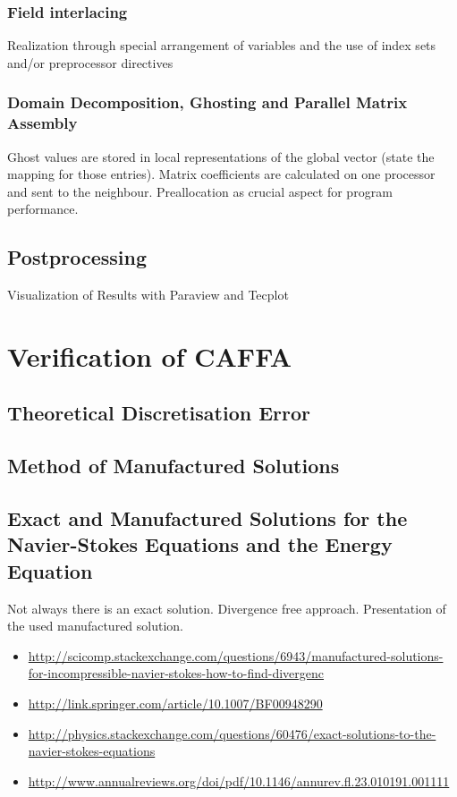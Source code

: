 \documentclass[article,type=msc,colorback,accentcolor=tud2a]{tudthesis}
\begin{document}
      \subsubsection{Field interlacing}
        Realization through special arrangement of variables and the use of index sets and/or preprocessor directives
      \subsubsection{Domain Decomposition, Ghosting and Parallel Matrix Assembly}

        Ghost values are stored in local representations of the global vector (state the mapping for those entries). Matrix coefficients are calculated on one processor and sent to the neighbour. Preallocation as crucial aspect for program performance.

    \subsection{Postprocessing}
    
      Visualization of Results with Paraview and Tecplot

  \section{Verification of CAFFA}

    \subsection{Theoretical Discretisation Error}
    \subsection{Method of Manufactured Solutions}
    \subsection{Exact and Manufactured Solutions for the Navier-Stokes Equations and the Energy Equation}
    Not always there is an exact solution. Divergence free approach. Presentation of the used manufactured solution. 
    \begin{itemize}
      \item \url{http://scicomp.stackexchange.com/questions/6943/manufactured-solutions-for-incompressible-navier-stokes-how-to-find-divergenc}
      \item \url{http://link.springer.com/article/10.1007/BF00948290}
      \item \url{http://physics.stackexchange.com/questions/60476/exact-solutions-to-the-navier-stokes-equations}
      \item \url{http://www.annualreviews.org/doi/pdf/10.1146/annurev.fl.23.010191.001111}
    \end{itemize}
\end{document}
